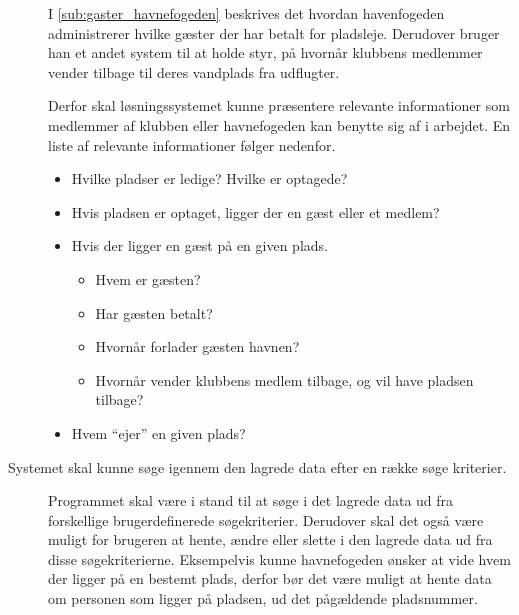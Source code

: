 \begin{description}
  I \cref{sub:gaster_havnefogeden} beskrives det hvordan havenfogeden administrerer hvilke gæster der har betalt for pladsleje. Derudover bruger han et andet system til at holde styr, på hvornår klubbens medlemmer vender tilbage til deres vandplads fra udflugter.

  Derfor skal løsningssystemet kunne præsentere relevante informationer som medlemmer af klubben eller havnefogeden kan benytte sig af i arbejdet. En liste af relevante informationer følger nedenfor.





  \begin{itemize}
  \item Hvilke pladser er ledige? Hvilke er optagede?
  \item Hvis pladsen er optaget, ligger der en gæst eller et medlem?
  \item Hvis der ligger en gæst på en given plads.
    \begin{itemize}
      \item Hvem er gæsten?
      \item Har gæsten betalt?
      \item Hvornår forlader gæsten havnen?
      \item Hvornår vender klubbens medlem tilbage, og vil have pladsen tilbage?
    \end{itemize}
  \item Hvem \enquote{ejer} en given plads?
  \end{itemize}

    \item[Systemet skal kunne søge igennem den lagrede data efter en række søge kriterier.]\hfill

Programmet skal være i stand til at søge i det lagrede data ud fra forskellige brugerdefinerede søgekriterier. Derudover skal det også være muligt for brugeren at hente, ændre eller slette i den lagrede data ud fra disse søgekriterierne. Eksempelvis kunne havnefogeden ønsker at vide hvem der ligger på en bestemt plads, derfor bør det være muligt at hente data om personen som ligger på pladsen, ud det pågældende pladsnummer.

\end{description}

